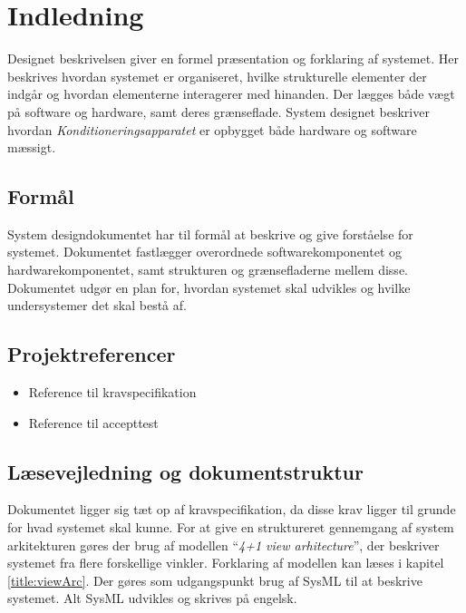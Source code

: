	\chapter{Indledning}
	Designet beskrivelsen giver en formel præsentation og forklaring af systemet. Her beskrives hvordan systemet er organiseret, hvilke strukturelle elementer der indgår og hvordan elementerne interagerer med hinanden. Der lægges både vægt på software og hardware, samt deres grænseflade. System designet beskriver hvordan \textit{Konditioneringsapparatet} er opbygget både hardware og software mæssigt.
	
	\section{Formål}
	System designdokumentet har til formål at beskrive og give forståelse for systemet. Dokumentet fastlægger overordnede softwarekomponentet og hardwarekomponentet, samt strukturen og grænsefladerne mellem disse. Dokumentet udgør en plan for, hvordan systemet skal udvikles og hvilke undersystemer det skal bestå af. 
	
	\section{Projektreferencer}
	\begin{itemize}
		\item Reference til kravspecifikation
		\item Reference til accepttest
	\end{itemize}
	
	\section{Læsevejledning og dokumentstruktur}
	Dokumentet ligger sig tæt op af kravspecifikation, da disse krav ligger til grunde for hvad systemet skal kunne. For at give en struktureret gennemgang af system arkitekturen gøres der brug af modellen “\textit{4+1 view arhitecture}”, der beskriver systemet fra flere forskellige vinkler. Forklaring af modellen kan læses i kapitel \ref{title:viewArc}. Der gøres som udgangspunkt brug af SysML til at beskrive systemet. Alt SysML udvikles og skrives på engelsk. 


